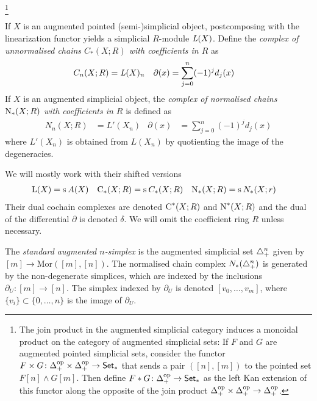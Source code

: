 \footnote{The join product in the augmented simplicial category induces a monoidal product on the category of augmented simplicial sets: If $F$ and $G$ are augmented pointed simplicial sets, consider the functor $F\times G\colon \Delta_+^{\mathrm{op}}\times \Delta_+^{\mathrm{op}}\to \mathsf{Set}_*$ that sends a pair $([n],[m])$ to the pointed set $F[n]\wedge G[m]$. Then define $F*G\colon \Delta_+^{\mathrm{op}}\to \mathsf{Set}_*$ as the left Kan extension of this functor along the opposite of the join product $\Delta_+^{\mathrm{op}}\times \Delta_+^{\mathrm{op}}\to \Delta_+^{\mathrm{op}}$.} 

If $X$ is an augmented pointed (semi-)simplicial object, postcomposing with the linearization functor yields a simplicial $R$-module $\operatorname{{\it L}}(X)$. Define the \emph{complex of unnormalised chains $C_*(X;R)$ with coefficients in $R$} as
\begin{align*}
C_n(X;R) &= \operatorname{{\it L}}(X)_n 
&
\partial(x) &= \sum_{j=0}^{n} (-1)^jd_j(x)
\end{align*}
If $X$ is an augmented simplicial object, the \emph{complex of normalised chains $\operatorname{N}_*(X;R)$ with coefficients in $R$} is defined as 
\begin{align*}
N_n(X;R) &= L'(X_n)
&
\partial(x) &= \sum_{j=0}^{n} (-1)^jd_j(x)
\end{align*}
where $L'(X_n)$ is obtained from $L(X_n)$ by quotienting the image of the degeneracies. 


We will mostly work with their shifted versions
\begin{align*}
    \operatorname{L}(X) &= \operatorname{s}^{}A(X)  & \operatorname{C}_*(X;R) &= \operatorname{s}^{} C_*(X;R) & \operatorname{N}_*(X;R) &= \operatorname{s}^{} N_*(X;r)
\end{align*}
Their dual cochain complexes are denoted $\operatorname{C}^*(X;R)$ and $\operatorname{N}^*(X;R)$ and the dual of the differential $\partial$ is denoted $\delta$. We will omit the coefficient ring $R$ unless necessary.


The \emph{standard augmented $n$-simplex} is the augmented simplicial set $\triangle^n_+$ given by $[m]\to \mathrm{Mor}([m],[n])$. The normalised chain complex $N_*(\triangle_{+}^n)$ is generated by the non-degenerate simplices, which are indexed by the inclusions $\partial_U\colon [m]\to [n]$. The simplex indexed by $\partial_U$ is denoted $[v_0,\ldots,v_{m}]$, where $\{v_i\}\subset \{0,\ldots,n\}$ is the image of $\partial_U$.



